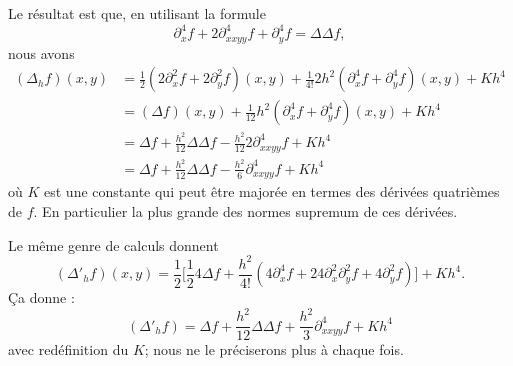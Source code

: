 Le résultat est que, en utilisant la formule
\begin{equation}
	\partial^4_xf+2\partial_{xxyy}^4f+\partial^4_yf=\Delta\Delta f,
\end{equation}
nous avons
\begin{subequations}
	\begin{align}
		(\Delta_hf)(x,y) & =\frac{ 1 }{2}(2\partial_x^2f+2\partial_y^2f)(x,y)+\frac{1}{ 4! }2h^2(\partial^4_xf+\partial_y^4f)(x,y)+Kh^4 \\
		                 & =(\Delta f)(x,y)+\frac{1}{ 12 }h^2(\partial_x^4f+\partial_y^4f)(x,y)+Kh^4                                    \\
		                 & =\Delta f+\frac{ h^2 }{ 12 }\Delta\Delta f-\frac{ h^2 }{ 12 }2\partial^4_{xxyy}f+Kh^4                        \\
		                 & =\Delta f+\frac{ h^2 }{ 12 }\Delta\Delta f-\frac{ h^2 }{ 6 }\partial^4_{xxyy}f+Kh^4
	\end{align}
\end{subequations}
où \( K\) est une constante qui peut être majorée en termes des dérivées quatrièmes de \( f\). En particulier la plus grande des normes supremum de ces dérivées.

Le même genre de calculs donnent
\begin{equation}
	(\Delta'_hf)(x,y)=\frac{ 1 }{2}\Big[  \frac{ 1 }{2}4\Delta f+\frac{h^2}{ 4! }(4\partial_x^4f+24\partial_x^2\partial_y^2f+4\partial_y^2f)   \Big]+Kh^4.
\end{equation}
Ça donne :
\begin{equation}
	(\Delta'_hf)=\Delta f+\frac{ h^2 }{ 12 }\Delta\Delta f+\frac{ h^2 }{ 3 }\partial^4_{xxyy}f+Kh^4
\end{equation}
avec redéfinition du \( K\); nous ne le préciserons plus à chaque fois.


